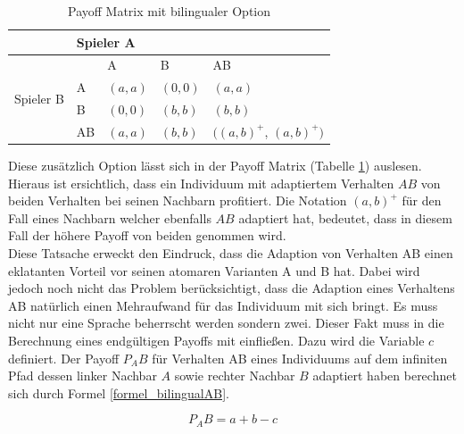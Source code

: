 \documentclass[12pt]{article}
\begin{document}
\begin{table}[h]
\centering
\caption{Payoff Matrix mit bilingualer Option}
\label{table_payoffBi}
\begin{tabular}{|l|l|l|l|l|}
\hline
                           & \multicolumn{4}{l|}{Spieler A}                                          \\ \hline
\multirow{4}{*}{Spieler B} &    & A     & B     & AB                                                 \\ \cline{2-5} 
                           & A  & $(a,a)$ & $(0,0)$ & $(a,a)$                                              \\ \cline{2-5} 
                           & B  & $(0,0)$ & $(b,b)$ & $(b,b)$                                              \\ \cline{2-5} 
                           & AB & $(a,a)$ & $(b,b)$ & $((a,b)^+$, $(a,b)^+)$ \\ \hline
\end{tabular}
\end{table}

Diese zusätzlich Option lässt sich in der Payoff Matrix (Tabelle \ref{table_payoffBi}) auslesen. Hieraus ist ersichtlich, dass ein Individuum mit adaptiertem Verhalten $AB$ von beiden Verhalten bei seinen Nachbarn profitiert. Die Notation $(a,b)^+$ für den Fall eines Nachbarn welcher ebenfalls $AB$ adaptiert hat, bedeutet, dass in diesem Fall der höhere Payoff von beiden genommen wird.\\
Diese Tatsache erweckt den Eindruck, dass die Adaption von Verhalten AB einen eklatanten Vorteil vor seinen atomaren Varianten A und B hat. Dabei wird jedoch noch nicht das Problem berücksichtigt, dass die Adaption eines Verhaltens AB natürlich einen Mehraufwand für das Individuum mit sich bringt. Es muss nicht nur eine Sprache beherrscht werden sondern zwei. Dieser Fakt muss in die Berechnung eines endgültigen Payoffs mit einfließen. Dazu wird die Variable $c$ definiert. Der Payoff $P_AB$ für Verhalten AB eines Individuums auf dem infiniten Pfad dessen linker Nachbar $A$ sowie rechter Nachbar $B$ adaptiert haben berechnet sich durch Formel \ref{formel_bilingualAB}.

%
  \begin{equation}
 \label{formel_bilingualAB}
 P_AB = a + b - c
 \end{equation}
\end{document}
